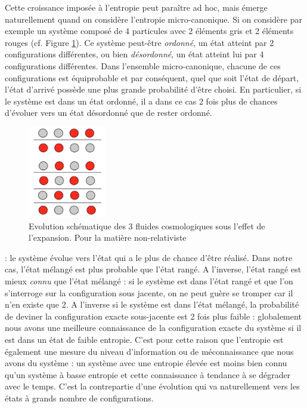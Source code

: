 Cette croissance imposée à l'entropie peut paraître ad hoc, mais émerge naturellement quand on considère l'entropie micro-canonique. Si on considère par exemple un système composé de 4 particules avec 2 éléments gris et 2 éléments rouges (cf. Figure \ref{f:micro}). Ce système peut-être \textit{ordonné}, un état atteint par 2 configurations différentes, ou bien \textit{désordonné}, un état atteint lui par 4 configurations différentes. Dans l'ensemble micro-canonique, chacune de ces configurations est équiprobable et par conséquent, quel que soit l'état de départ, l'état d'arrivé possède une plus grande probabilité d'être choisi. En particulier, si le système est dans un état ordonné, il a dans ce cas 2 fois plus de chances d'évoluer vers un état désordonné que de rester ordonné. 
\begin{figure}[htbp]
	\centering
		\includegraphics[height=4cm]{figs/micro.png}
	\caption{Evolution schématique des 3 fluides cosmologiques sous l'effet de l'expansion. Pour la matière non-relativiste}
	\label{f:micro}
\end{figure}

 : le système évolue vers l'état qui a le plus de chance d'être réalisé. Dans notre cas, l'état mélangé est plus probable que l'état rangé. A l'inverse, l'état rangé est mieux \textit{connu} que l'état mélangé : si le système est dans l'état rangé et que l'on s'interroge sur la configuration sous jacente, on ne peut guère se tromper car il n'en existe que 2. A l'inverse si le système est dans l'état mélangé, la probabilité de deviner la configuration exacte sous-jacente est 2 fois plus faible : globalement nous avons une meilleure connaissance de la configuration exacte du système si il est dans un état de faible entropie. C'est pour cette raison que l'entropie est également une mesure du niveau d'information ou de méconnaissance que nous avons du système : un système avec une entropie élevée est moins bien connu qu'un système à basse entropie et cette connaissance à tendance à se dégrader avec le temps. C'est la contrepartie d'une évolution qui va naturellement vers les états à grands nombre de configurations.

